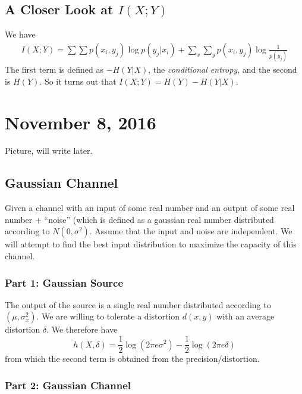 \documentclass[11pt]{article}
\theoremstyle{definition}
\begin{document}
\subsection{A Closer Look at $I(X;Y)$}

We have 
\begin{align*}
I(X;Y) = \sum \sum p(x_i, y_j) \log p(y_j | x_i) + \sum_x \sum_y p(x_i, y_j) \log \frac{1}{p(y_j)}
\end{align*}
The first term is defined as $-H(Y|X)$, the \textit{conditional entropy}, and the second is $H(Y)$. So it turns out that $I(X;Y) = H(Y) - H(Y|X)$.

\section{November 8, 2016}

 Picture, will write later.

\subsection{Gaussian Channel}
Given a channel with an input of some real number and an output of some real number + ``noise'' (which is defined as a gaussian real number distributed according to $N(0, \sigma^2)$. Assume that the input and noise are independent. We will attempt to find the best input distribution to maximize the capacity of this channel. 

\subsubsection{Part 1: Gaussian Source}

The output of the source is a single real number distributed according to $(\mu, \sigma_x^2)$. We are willing to tolerate a distortion $d(x,y)$ with an average distortion $\delta$. We therefore have $$h(X, \delta) = \frac{1}{2}\log(2\pi e \sigma^2) - \frac{1}{2} \log(2 \pi e \delta)$$from which the second term is obtained from the precision/distortion. 

\subsubsection{Part 2: Gaussian Channel}
\end{document}
